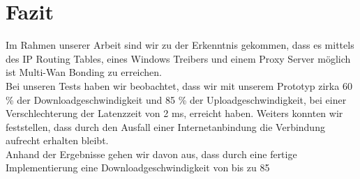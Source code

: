 \chapter{Fazit}
\label{cha:Fazit}

Im Rahmen unserer Arbeit sind wir zu der Erkenntnis gekommen, dass es mittels des IP Routing Tables, eines Windows Treibers und einem Proxy Server möglich ist Multi-Wan Bonding zu erreichen.
\\
Bei unseren Tests haben wir beobachtet, dass wir mit unserem Prototyp zirka 60 \% der Downloadgeschwindigkeit und 85 \% der Uploadgeschwindigkeit, bei einer Verschlechterung der Latenzzeit von 2 ms, erreicht haben. Weiters konnten wir feststellen, dass durch den Ausfall einer Internetanbindung die Verbindung aufrecht erhalten bleibt.
\\
Anhand der Ergebnisse gehen wir davon aus, dass durch eine fertige Implementierung eine Downloadgeschwindigkeit von bis zu 85%
